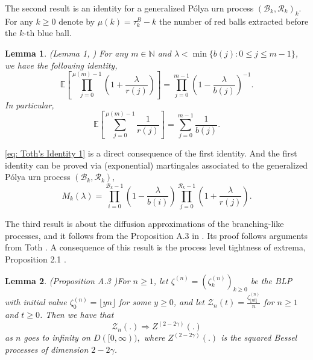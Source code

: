 \documentclass[twoside,12pt,a4paper]{article}
\newtheorem{lemma}{Lemma}[section]
\numberwithin{equation}{section}
\begin{document}
		The second result is an identity for a generalized P\'{o}lya urn process $(\mathcal{B}_{k},\mathcal{R}_{k})_k$. For any $k\geq 0$ denote by $\mu(k)= \tau^B_k - k$ the number of red balls extracted before the $k$-th blue ball. 
		\begin{lemma}(Lemma 1, \cite{T96}) \label{lm: Toth's Identity}
			For any $m\in \mathbb{N}$ and $\lambda < \min\{ b(j): 0\leq j\leq m-1 \}$, we have the following identity,
			$$  \mathbb{E}\left[  \prod_{j=0}^{ \mu(m)-1 } \left(1+ \frac{\lambda}{r(j)}   \right) \right] =   \prod_{j=0}^{ m-1 } \left(1- \frac{\lambda}{b(j)}   \right)^{-1}.   $$ 
			In particular, 
			\begin{equation}\label{eq: Toth's Identity 1}
				\mathbb{E}\left[  \sum_{j=0}^{ \mu(m)-1 } \frac{1}{r(j)}   \right] =   \sum_{j=0}^{ m-1 } \frac{1}{b(j)}.
			\end{equation}	
		\end{lemma}
		\eqref{eq: Toth's Identity 1} is a direct consequence of the first identity. And the first identity can be proved via (exponential) martingales associated to the generalized P\'{o}lya urn process $(\mathcal{B}_{k},\mathcal{R}_{k})$, 
		$$M_k(\lambda) = \prod_{i=0}^{ \mathcal{B}_{k}-1 } \left(1-\frac{\lambda}{b(i)}\right) \prod_{j=0}^{\mathcal{R}_{k}-1 } \left(1+\frac{\lambda}{r(j)}\right). $$
		
		The third result is about the diffusion approximations of the branching-like processes, and it follows from the Proposition A.3 in \cite{KMP22}. Its proof follows arguments from Toth \cite{T96}. A consequence of this result is the process level tightness of extrema, Proposition 2.1 \cite{KMP22}. 
		
		\begin{lemma}(Proposition A.3 \cite{KMP22})\label{lm: diffusion approximation of blp}
			For $n\geq 1$, let $\zeta^{(n)}=(\zeta^{(n)}_k)_{k\geq 0 }  $ be the BLP with initial value $\zeta^{(n)}_0 = \lfloor yn \rfloor$ for some $y \geq 0$, and let $\mathcal{Z}_n(t) = \frac{\zeta^{(n)}_{\lfloor nt \rfloor}}{n}$ for $n\geq 1$ and $t\geq 0$. Then we have that 
			$$
			\mathcal{Z}_n(.) \Longrightarrow Z^{(2-2\gamma)}(.)
			$$ as $n$ goes to infinity on $D([0,\infty)),$ where $Z^{(2-2\gamma)}(.)$ is the squared Bessel processes of dimension $2-2\gamma$.
		\end{lemma}
\end{document}
